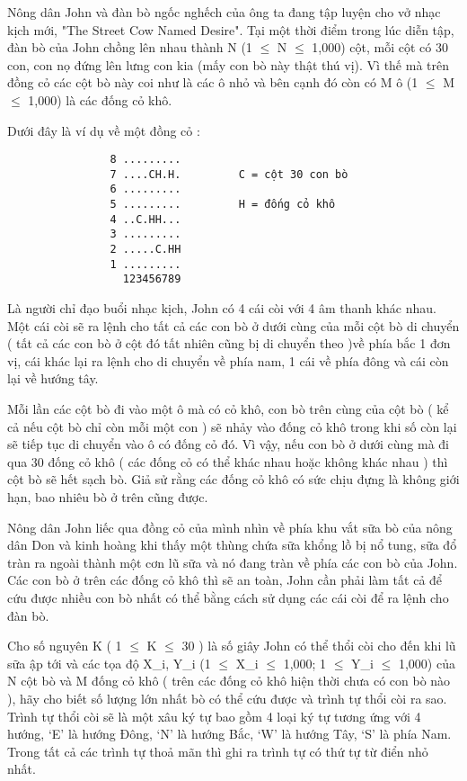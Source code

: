



   Nông dân John và đàn bò ngốc nghếch của ông ta đang tập luyện cho vở  nhạc kịch mới, "The Street Cow Named Desire". Tại một thời điểm trong  lúc diễn tập, đàn bò của John chồng lên nhau thành N (1  $\le$  N  $\le$  1,000)  cột, mỗi cột có 30 con, con nọ đứng lên lưng con kia (mấy con bò này thật  thú vị). Vì thế mà trên đồng cỏ các cột bò này coi như là các ô nhỏ và  bên cạnh đó còn có M ô (1  $\le$  M  $\le$  1,000) là các đống cỏ khô.  

   Dưới đây là ví dụ về một đồng cỏ :  
\begin{verbatim}
                8 .........
                7 ....CH.H.         C = cột 30 con bò
                6 .........
                5 .........         H = đống cỏ khô
                4 ..C.HH...
                3 .........
                2 .....C.HH
                1 .........
                  123456789
\end{verbatim}

   Là người chỉ đạo buổi nhạc kịch, John có 4 cái còi với 4 âm thanh khác nhau. Một cái còi sẽ ra lệnh cho tất cả các con bò ở dưới cùng của mỗi cột bò  di chuyển ( tất cả các con bò ở cột đó tất nhiên cũng bị di chuyển theo )về phía  bắc 1 đơn vị, cái khác lại ra lệnh cho di chuyển về phía nam, 1 cái  về phía đông và cái còn lại về hướng tây.  

   Mỗi lần các cột bò đi vào một ô mà có cỏ khô, con bò trên cùng của cột  bò ( kể cả nếu cột bò chỉ còn mỗi một con ) sẽ nhảy vào đống cỏ khô trong  khi số còn lại sẽ tiếp tục di chuyển vào ô có đống cỏ đó. Vì vậy, nếu con  bò ở dưới cùng mà đi qua 30 đống cỏ khô ( các đống cỏ có thể khác nhau  hoặc không khác nhau ) thì cột bò sẽ hết sạch bò. Giả sử rằng các đống cỏ  khô có sức chịu đựng là không giới hạn, bao nhiêu bò ở trên cũng được.  

   Nông dân John liếc qua đồng cỏ của mình nhìn về phía khu vắt sữa bò  của nông dân Don và kinh hoàng khi thấy một thùng chứa sữa khổng lồ  bị nổ tung, sữa đổ tràn ra ngoài thành một cơn lũ sữa và nó đang  tràn về phía các con bò của John. Các con bò ở trên các đống cỏ khô  thì sẽ an toàn, John cần phải làm tất cả để cứu được nhiều con bò nhất  có thể bằng cách sử dụng các cái còi để ra lệnh cho đàn bò.  

   Cho số nguyên K ( 1  $\le$  K  $\le$  30 ) là số giây John có thể thổi còi cho  đến khi lũ sữa ập tới và các tọa độ X\_i, Y\_i (1  $\le$  X\_i  $\le$  1,000;  1  $\le$  Y\_i  $\le$  1,000) của N cột bò và M đống cỏ khô ( trên các đống  cỏ khô hiện thời chưa có con bò nào ), hãy cho biết số lượng lớn nhất bò  có thể cứu được và trình tự thổi còi ra sao. Trình tự thổi còi sẽ  là một xâu ký tự bao gồm 4 loại ký tự tương ứng với 4 hướng, ‘E’ là  hướng Đông, ‘N’ là hướng Bắc, ‘W’ là hướng Tây, ‘S’ là phía Nam.  Trong tất cả các trình tự thoả mãn thì ghi ra trình tự có thứ tự từ điển nhỏ nhất.  

